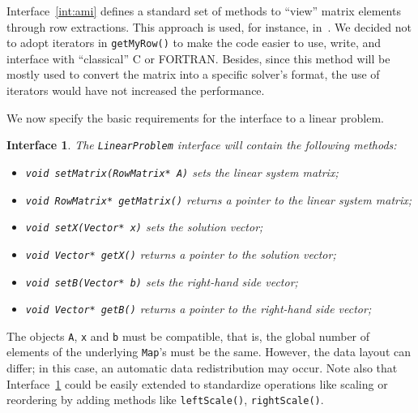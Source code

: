 \documentclass[acmtoms,acmnow]{acmtrans2m}
\newtheorem{interface}{Interface}[section]
\begin{document}
Interface~\ref{int:ami} defines a standard set of methods to
``view'' matrix elements through row extractions. This approach is
used, for instance,
in~\cite{Epetra-Ref-Guide,ml-guide,duff02overview,lujan00oolala}. We
decided not to adopt iterators in {\tt getMyRow()} to make the code
easier to use,
    write, and interface with ``classical'' C or FORTRAN.
Besides, since this method will be mostly used to convert the matrix
into a specific solver's format, the use of iterators would have not
increased the performance.

\smallskip

We now specify the basic requirements for the interface to a linear problem.
\begin{interface}
\label{int:lp}
The {\tt LinearProblem} interface
will contain the following methods:
\begin{itemize}
\item \verb!void setMatrix(RowMatrix* A)! sets the linear system matrix;
\item \verb!void RowMatrix* getMatrix()! returns a pointer to the
linear system matrix;
\item \verb!void setX(Vector* x)! sets the solution vector;
\item \verb!void Vector* getX()! returns a pointer to the solution vector;
\item \verb!void setB(Vector* b)! sets the right-hand side vector;
\item \verb!void Vector* getB()! returns a pointer to the right-hand side vector;
\end{itemize}
\end{interface}
The objects \verb!A!, \verb!x! and \verb!b! must be compatible, that
is, the global number of elements of the underlying {\tt Map}'s must
be the same. However, the data layout can differ; in this case, an automatic
data redistribution may occur. Note also that
Interface~\ref{int:lp} could be easily extended to standardize
operations like scaling or reordering by adding methods like
\verb!leftScale()!, \verb!rightScale()!.


\end{document}
